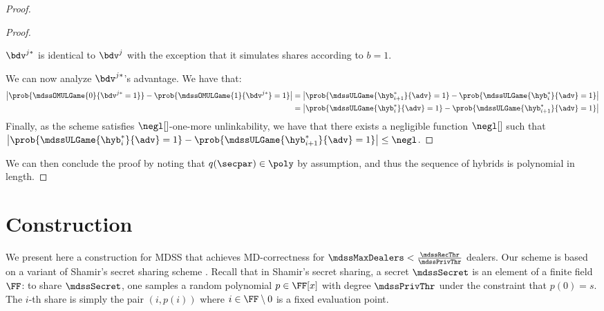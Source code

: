 \begin{proof}
\begin{proof}
\begin{pcvstack}[center, space=1em]
		\end{pcvstack}
		$\bdv^{j*}$ is identical to $\bdv^j$ with the exception that it simulates shares according to $b = 1$.

		We can now analyze $\bdv^{j*}$'s advantage.
		We have that:
		\begin{align*}
			\left| \prob{\mdssOMULGame{0}{\bdv^{j*} = 1}} - \prob{\mdssOMULGame{1}{\bdv^{j*}} = 1} \right| & =
			\left| \prob{\mdssULGame{\hyb^*_{i + 1}}{\adv} =1} - \prob{\mdssULGame{\hyb^*_{i}}{\adv} = 1} \right|                                                                                                    \\
			                                                                                               & = \left| \prob{\mdssULGame{\hyb^*_{i}}{\adv} =1} - \prob{\mdssULGame{\hyb^*_{i + 1}}{\adv} = 1} \right| \\
		\end{align*}
		Finally, as the scheme satisfies $\negl[]$-one-more unlinkability, we have that there exists a negligible function $\negl[]$ such that
		$\left| \prob{\mdssULGame{\hyb^*_i}{\adv} =1} - \prob{\mdssULGame{\hyb^*_{i + 1}}{\adv} = 1} \right| \leq \negl$.

	\end{proof}

	We can then conclude the proof by noting that $q(\secpar) \in \poly$ by assumption, and thus the sequence of hybrids is polynomial in length.
\end{proof}



\section{Construction}
We present here a construction for MDSS that achieves MD-correctness for $\mdssMaxDealers < \frac{\mdssRecThr}{\mdssPrivThr}$ dealers.
Our scheme is based on a variant of Shamir's secret sharing scheme \cite{Shamir79}.
Recall that in Shamir's secret sharing, a secret $\mdssSecret$ is an element of a finite field $\FF$: to share $\mdssSecret$, one samples a random polynomial $p \in \FF[x]$ with degree $\mdssPrivThr$ under the constraint that $p(0) = s$.
The $i$-th share is simply the pair $(i, p(i))$ where $i \in \FF \setminus 0$ is a fixed evaluation point.

